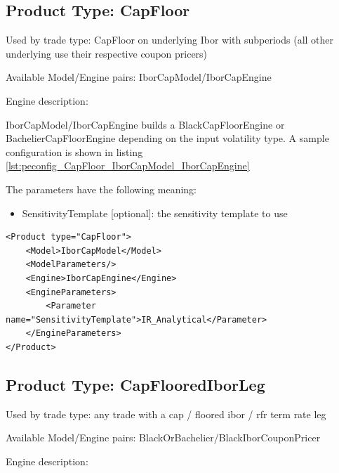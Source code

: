 \subsection{Product Type: CapFloor}

Used by trade type: CapFloor on underlying Ibor with subperiods (all other underlying use their respective coupon pricers)

Available Model/Engine pairs: IborCapModel/IborCapEngine

Engine description:

IborCapModel/IborCapEngine builds a BlackCapFloorEngine or BachelierCapFloorEngine depending on the input volatility
type. A sample configuration is shown in listing \ref{lst:peconfig_CapFloor_IborCapModel_IborCapEngine}

The parameters have the following meaning:

\begin{itemize}
\item SensitivityTemplate [optional]: the sensitivity template to use
\end{itemize}

\begin{longlisting}
\begin{verbatim}
<Product type="CapFloor">
    <Model>IborCapModel</Model>
    <ModelParameters/>
    <Engine>IborCapEngine</Engine>
    <EngineParameters>
        <Parameter name="SensitivityTemplate">IR_Analytical</Parameter>
    </EngineParameters>
</Product>
\end{verbatim}
\caption{Configuration for Product CapFloor, Model IborCapModel, Engine IborCapEngine}
\label{lst:peconfig_CapFloor_IborCapModel_IborCapEngine}
\end{longlisting}

\subsection{Product Type: CapFlooredIborLeg}

Used by trade type: any trade with a cap / floored ibor / rfr term rate leg

Available Model/Engine pairs: BlackOrBachelier/BlackIborCouponPricer

Engine description:


